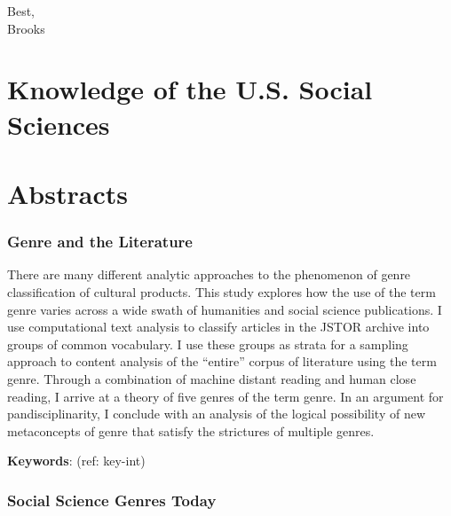 \documentclass[]{book}
\theoremstyle{definition}
\theoremstyle{definition}
\theoremstyle{definition}
\theoremstyle{remark}
\begin{document}
Best,\\
Brooks

\hypertarget{knowledge-of-the-u.s.-social-sciences}{%
\chapter*{Knowledge of the U.S. Social
Sciences}\label{knowledge-of-the-u.s.-social-sciences}}


\hypertarget{abstracts}{%
\chapter*{Abstracts}\label{abstracts}}


\hypertarget{genre-and-the-literature}{%
\subsection*{Genre and the Literature}\label{genre-and-the-literature}}















There are many different analytic approaches to the
phenomenon of genre classification of cultural products. This study
explores how the use of the term genre varies across a wide swath of
humanities and social science publications. I use computational text
analysis to classify articles in the JSTOR archive into groups of common
vocabulary. I use these groups as strata for a sampling approach to
content analysis of the ``entire'' corpus of literature using the term
genre. Through a combination of machine distant reading and human close
reading, I arrive at a theory of five genres of the term genre. In an
argument for pandisciplinarity, I conclude with an analysis of the
logical possibility of new metaconcepts of genre that satisfy the
strictures of multiple genres.




\textbf{Keywords}: (ref: key-int)

\hypertarget{social-science-genres-today}{%
\subsection*{Social Science Genres
Today}\label{social-science-genres-today}}
\end{document}
